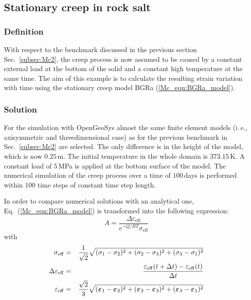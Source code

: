 \subsection{Stationary creep in rock salt}
\label{subsec:Mc3}

\subsubsection{Definition}
\label{subsubsec:Mc3_def}

With respect to the benchmark discussed in the previous section Sec.~\ref{subsec:Mc2}, the creep process is now assumed to be caused by a constant external load at the bottom of the solid and a constant high temperature at the same time. The aim of this example is to calculate the resulting strain variation with time using the stationary creep model BGRa (\ref{Mc_eqn:BGRa_model}).

\subsubsection{Solution}
\label{subsubsec:Mc3_sol}

For the simulation with OpenGeoSys almost the same finite element models (i.\,e., axisymmetric and threedimensional case) as for the previous benchmark in Sec.~\ref{subsec:Mc2} are selected. The only difference is in the height of the model, which is now $0.25\,$m. The initial temperature in the whole domain is $373.15\,$K. A constant load of $5\,$MPa is applied at the bottom surface of the model. The numerical simulation of the creep process over a time of $100\,$days is performed within 100 time steps of constant time step length.

In order to compare numerical solutions with an analytical one, Eq.~(\ref{Mc_eqn:BGRa_model}) is transformed into the following expression:
%
\begin{equation}
A
=
\frac
{\Delta\varepsilon_{\mathrm{eff}}}
{e^{-Q/RT} \sigma_{\mathrm{eff}}}
\label{Mc_eqn:BGRa_model_4}
\end{equation}
%
with
%
\begin{eqnarray}
\sigma_{\mathrm{eff}}
&=&
\frac{1}{\sqrt{2}}
\sqrt{(\sigma_1-\sigma_2)^2 + (\sigma_2-\sigma_3)^2 + (\sigma_3-\sigma_1)^2}
\nonumber
\\
\Delta\varepsilon_{\mathrm{eff}}
&=&
\frac
{\varepsilon_{\mathrm{eff}}(t+\Delta t) - \varepsilon_{\mathrm{eff}}(t)}
{\Delta t}
\\
\varepsilon_{\mathrm{eff}}
&=&
\frac{\sqrt{2}}{3}
\sqrt{(\miu{\varepsilon}{1}{}-\miu{\varepsilon}{2}{})^2 + (\miu{\varepsilon}{2}{}-\miu{\varepsilon}{3}{})^2 + (\miu{\varepsilon}{3}{}-\miu{\varepsilon}{1}{})^2}
\nonumber
\label{Mc_eqn:BGRa_model_5}
\end{eqnarray}

